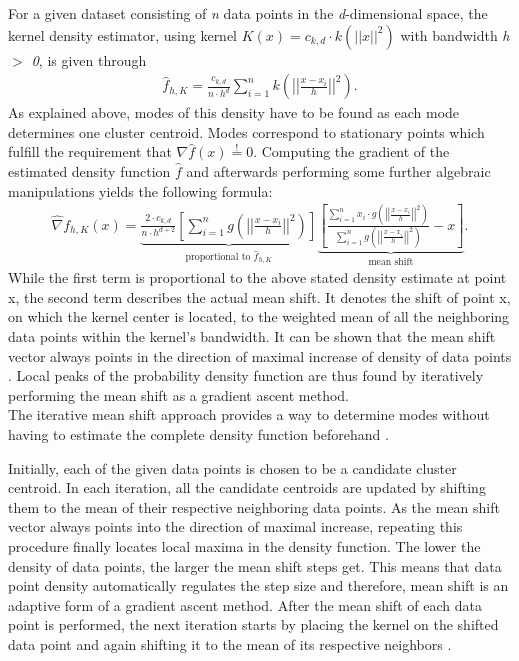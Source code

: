 For a given dataset consisting of \textit{n} data points in the \textit{d}-dimensional space, the kernel density estimator, using kernel $K(x)=c_{k, d} \cdot k \left( ||x||^{2} \right)$ with bandwidth \textit{h $>$ 0}, is given through\\
\begin{align*}
	\hat{f}_{h, K} = \frac{c_{k, d}}{n \cdot h^{d}} \sum_{i=1}^{n} k \left( \left|\left|\frac{x - x_{i}}{h} \right|\right|^{2}\right).
\end{align*}
As explained above, modes of this density have to be found as each mode determines one cluster centroid. Modes correspond to stationary points which fulfill the requirement that $\nabla \hat{f}(x) \overset{!}{=} 0$. Computing the gradient of the estimated density function $\hat{f}$ and afterwards performing some further algebraic manipulations yields the following formula:
\begin{align*}
	\hat{\nabla} f_{h,K}(x) = \underbrace{\frac{2 \cdot c_{k, d}}{n \cdot h^{d+2}} \left[ \sum_{i=1}^{n} g \left( \left| \left| \frac{x-x_{i}}{h} \right| \right| ^{2} \right) \right]}_{\text{proportional to $\hat{f}_{h, K}$}}\underbrace{ \left[ \frac{\sum_{i=1}^{n} x_{i} \cdot g \left( \left| \left| \frac{x-x_{i}}{h} \right| \right| ^{2} \right)}{\sum_{i=1}^{n} g \left( \left| \left| \frac{x-x_{i}}{h} \right| \right| ^{2} \right)} - x \right]}_{\text{mean shift}}.
\end{align*}
While the first term is proportional to the above stated density estimate at point x, the second term describes the actual mean shift. It denotes the shift of point x, on which the kernel center is located, to the weighted mean of all the neighboring data points within the kernel's bandwidth. It can be shown that the mean shift vector always points in the direction of maximal increase of density of data points \cite{comaniciu2002MeanShift}. 
Local peaks of the probability density function are thus found by iteratively performing the mean shift as a gradient ascent method.\\
The iterative mean shift approach provides a way to determine modes without having to estimate the complete density function beforehand \cite{comaniciu2002MeanShift}.

Initially, each of the given data points is chosen to be a candidate cluster centroid. In each iteration, all the candidate centroids are updated by shifting them to the mean of their respective neighboring data points. As the mean shift vector always points into the direction of maximal increase, repeating this procedure finally locates local maxima in the density function.
The lower the density of data points, the larger the mean shift steps get. This means that data point density automatically regulates the step size and therefore, mean shift is an adaptive form of a gradient ascent method. 
After the mean shift of each data point is performed, the next iteration starts by placing the kernel on the shifted data point and again shifting it to the mean of its respective neighbors \cite{400568}. 

